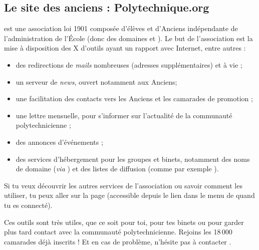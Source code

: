 \subsection{Le site des anciens : Polytechnique.org}
 est une association loi 1901 composée d'élèves et d'Anciens
 indépendante de l'administration de l'École (donc des domaines 
 et ). Le but de l'association est la mise à disposition des X d'outils
ayant un rapport avec Internet, entre autres :
\begin{itemize}
  \item des redirections de \emph{mails} nombreuses (adresses supplémentaires) et à vie ;
  \item un serveur de \emph{news}, ouvert notamment aux Anciens;
  \item une facilitation des contacts vers les Anciens et les camarades de promotion ;
  \item une lettre mensuelle, pour s'informer sur l'actualité de la communauté polytechnicienne ;
  \item des annonces d'événements ;
  \item des services d'hébergement pour les groupes et binets, notamment des noms de domaine (\emph{via} ) et des listes de diffusion (comme par exemple ).
\end{itemize}
Si tu veux découvrir les autres services de l'association ou savoir
comment les utiliser, tu peux aller sur la page
 (accessible depuis
le lien  dans le menu de 
quand tu es connecté).



 Ces outils sont très utiles, que
ce soit pour toi, pour tes binets ou pour garder plus tard contact avec la communauté polytechnicienne. Rejoins
les 18\,000 camarades déjà inscrits ! Et en cas de problème, n'hésite pas à contacter
.
